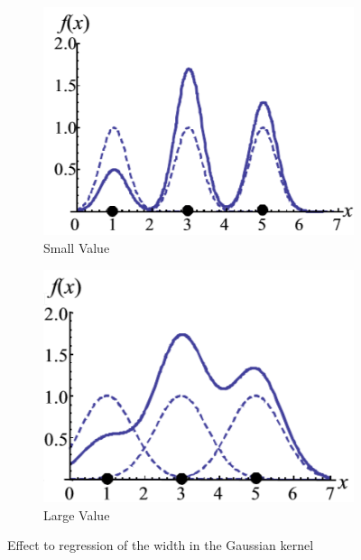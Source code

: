 \begin{figure}
	\centering
	\begin{subfigure}{.5\textwidth}
		\centering
		\includegraphics[width=1\linewidth]{figures/GaussianWidthSmall.png}
		\caption{Small Value \label{FigSmallWidth}}
	\end{subfigure}%
	\begin{subfigure}{.5\textwidth}
		\centering
		\includegraphics[width=1\linewidth]{figures/GaussianWidthLarge.png}
		\caption{Large Value \label{FigLargeWidth}}
	\end{subfigure}
	\caption[Effect of width in Gaussian Kernel]{Effect to regression of the width in the Gaussian kernel\cite{Kitayama.2011}}
	\label{FigGaussianWidthRegression}
\end{figure}
